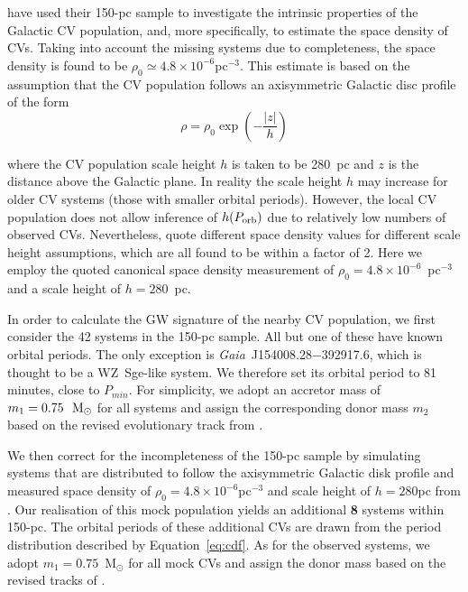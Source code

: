 \documentclass[fleqn,usenatbib]{mnras}
\newcommand{\gaia}{{\it Gaia}}
\begin{document}
\cite{pala20} have used their 150-pc sample to investigate the intrinsic properties of the Galactic CV population, and, more specifically, to estimate the space density of CVs. Taking into account the missing systems due to completeness, the space density is found to be $\rho_0\simeq4.8 \times 10^{-6}$pc$^{-3}$. This estimate is based on the assumption that the CV population follows an axisymmetric Galactic disc profile of the form
\begin{equation}
\label{eq:disk}
    \rho = \rho_{0} \exp \left(-\frac{|z|}{h}\right)
\end{equation}

\noindent where the CV population scale height $h$ is taken to be 280~pc and $z$ is the distance above the Galactic plane. In reality the scale height $h$ may increase for older CV systems (those with smaller orbital periods). However, the local CV population does not allow inference of $h(P_{\rm{orb}})$ due to relatively low numbers of observed CVs. Nevertheless, \cite{pala20} quote different space density values for different scale height assumptions, which are all found to be within a factor of 2. Here we employ the quoted canonical space density measurement of $\rho_0=4.8 \times 10^{-6}$~pc$^{-3}$ and a scale height of $h=280$~pc.

In order to calculate the GW signature of the nearby CV population, we first consider the 42 systems in the \citet{pala20} 150-pc sample. All but one of these have known orbital periods. The only exception is \gaia\ J154008.28$-$392917.6, which is thought to be a  WZ~Sge-like system. We therefore set its orbital period to 81 minutes, close to $P_{min}$. For simplicity, we adopt an accretor mass of $m_1 = 0.75\ ~ \rm{M_{\odot}}$ for all systems and assign the corresponding donor mass $m_2$ based on the revised evolutionary track from \citet{knigge11}. 

We then correct for the incompleteness of the \citet{pala20} 150-pc sample by simulating systems that are distributed to follow the axisymmetric Galactic disk profile and measured space density of $\rho_0=4.8 \times 10^{-6}$pc$^{-3}$ and scale height of $h=280$pc from \cite{pala20}. Our realisation of this mock population yields an additional \textbf{8} systems within 150-pc. The orbital periods of these additional CVs are drawn from the period distribution described by Equation~\ref{eq:cdf}. As for the observed systems, we adopt $m_1=0.75$~M$_{\odot}$ for all mock CVs and assign the donor mass based on the revised tracks of \cite{knigge11}. 
\end{document}
